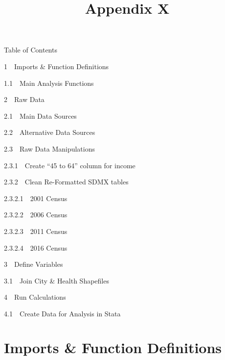 \documentclass[11pt]{article}
\title{Appendix X}
\begin{document}
    
    
    \maketitle
    
    

    
    Table of Contents{}

{{1~~}Imports \& Function Definitions}

{{1.1~~}Main Analysis Functions}

{{2~~}Raw Data}

{{2.1~~}Main Data Sources}

{{2.2~~}Alternative Data Sources}

{{2.3~~}Raw Data Manipulations}

{{2.3.1~~}Create ``45 to 64'' column for income}

{{2.3.2~~}Clean Re-Formatted SDMX tables}

{{2.3.2.1~~}2001 Census}

{{2.3.2.2~~}2006 Census}

{{2.3.2.3~~}2011 Census}

{{2.3.2.4~~}2016 Census}

{{3~~}Define Variables}

{{3.1~~}Join City \& Health Shapefiles}

{{4~~}Run Calculations}

{{4.1~~}Create Data for Analysis in Stata}

    \hypertarget{imports-function-definitions}{%
\section{Imports \& Function
Definitions}\label{imports-function-definitions}}
\end{document}

